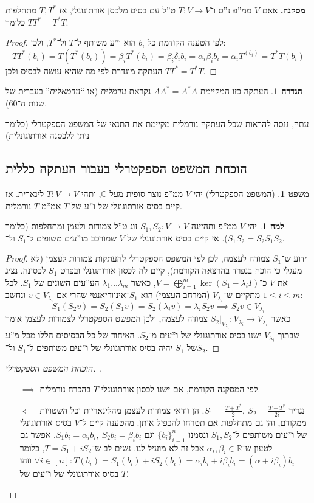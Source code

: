 \documentclass[a4paper]{article}
\newcommand\R     {\mathbb{R}}
\newcommand\C     {\mathbb{C}}
\newcommand\co        {\colon}
\newcommand\ag        {\alpha}
\newcommand\bg        {\beta}
\newcommand\dg        {\delta}
\renewcommand\lg      {\lambda}
\theoremstyle{definition}
\newtheorem{Theorem}{משפט}
\newtheorem{definition}{הגדרה}
\newtheorem{Lemma}{למה}
\newcommand\theo  [1] {\begin{Theorem}#1\end{Theorem}}
\newcommand\defi  [1] {\begin{definition}#1\end{definition}}
\newcommand\lem   [1] {\begin{Lemma}#1\end{Lemma}}
\begin{document}
	\textbf{מסקנה. }אאם $V$ ממ''פ נ''ס ו־$T \co V \to V$ ט''ל עם בסיס מלכסן אורתוגונלי, אז $T, T^*$ מתחלפות כלומר $TT^* = T^*T$. \begin{proof}
		לפי הטענה הקודמת כל $b_i$ הוא ו''ע משותף ל־$T$ ול־$T^*$, ולכן: 
		\[ TT^*(b_i) = T(T^*(b_i)) = \bg_i T^*(b_i) = \bg_i \dg_i b_i = \ag_i \bg_i b_i = \ag_i T^(b_i) = T^*T(b_i) \]
		העתקה מוגדרת לפי מה שהיא עושה לבסיס ולכן $TT^* = T^*T$. 
	\end{proof}
	\defi{העתקה כזו המקיימת $AA^* = A^*A$ נקראת \textit{נורמלית} (או ``\textit{נורמאלית}'' בעברית של שנות ה־60). }
	
	עתה, ננסה להראות שכל העתקה נורמלית מקיימת את התנאי של המשפט הספקטרלי (כלומר ניתן ללכסנה אורתוגונלית)
	
	\subsection{הוכחת המשפט הספקטרלי בעבור העתקה כללית}
	\theo{(המשפט הספקטרלי) יהי $V$ ממ''פ נוצר סופית מעל $\C$, ותהי $T \co V \to V$ לינארית. אז קיים בסיס אורתוגונלי של ו''ע של $T$ אמ''מ $T$ נורמלית. }
	\lem{יהי $V$ ממ''פ ותהיינה $S_1, S_2 \co V \to V$  זוג ט''ל צמודות ולעמן ומתחלפות (כלומר $S_1S_2 = S_2 S_1$). אז קיים בסיס אורתוגונלי של $V$ שמורכב מו''עים משופים ל־$S_1$ ול־$S_2$. }\begin{proof}
		ידוע ש־$S_1$ צמודה לעצמה, לכן לפי המשפט הספקטרלי להעתקות צמודות לעצמן (לא מעגלי כי הוכח בנפרד בהרצאה הקודמת), קיים לה לכסון אורותגונלי ובפרט $S_1$ לכסינה. נציג את $V$ כ־$V = \bigoplus_{i = 1}^{m} \ker(S_1 - \lg_iI)$, כאשר $\lg _1 \dots \lg_m$ הע''עים השונים של $S_1$. לכל $1 \le i \le m$  מתקיים ש־$V_{\lg_i}$ (המרחב העצמי) הוא $S_1$־אינווריאנטי שהרי אם $v \in V_{\lg_i}$ ונחשב: 
		\[ S_1(S_2 v) = S_2(S_1 v) = S_2(\lg_i v) = \lg _i S_2v \implies S_2 v \in V_{\lg_i} \]
		כאשר $S_2|_{V_{\lg _i}} \co V_{\lg_i} \to V_{\lg_i}$ צמודה לעצמה, ולכן המפשט הספקטרלי לצמודות לעצמן אומר שבתוך $V_{\lg_i}$ ישנו בסיס אורתוגונלי של ו''עים מ־$S_2$. האיחוד של כל הבסיסים הללו מכל מ''ע של $S_1$ יהיה בסיס אורתוגונלי של ו''עים משותפים ל־$S_1$ ול־$S_2$. 
	\end{proof}
	\begin{proof}[הוכחת המשפט הספקטרלי. ]\,
		\begin{itemize}
			\item[$\implies$] לפי המסקנה הקודמת, אם ישנו לכסון אורתוגונלי $T$ בהכרח נורמלית. 
			\item[$\impliedby$] נגדיר $S_1 = \frac{T + T^*}{2}, \ S_2 = \frac{T - T^*}{2i}$. הן וודאי צמודות לעצמן מהלינאריות וכל השטויות ממקודם, והן גם מתחלפות אם תטרחו להכפיל אותן. מהטענה קיים ל־$V$ בסיס אורתוגונלי של ו''עים משותפים ל־$S_1, S_2$ ונסמנו $\{b_i\}^{n}_{i = 1}$ וגם $S_1b_i = \ag_i b_i, \ S_2b_i= \bg_i b_i$. אפשר גם לטעון ש־$\ag_i, \bg_i \in \R$ אבל זה לא מועיל לנו. נשים לב ש־$T = S_1 + iS_2$, כלומר $\forall i \in [n] \co T(b_i) = S_1(b_i) + iS_2(b_i) = \ag_i b_i + i\bg_i b_i = (\ag + i\bg_i)b_i$ וזהו בסיס אורתוגונלי של ו''עים של $T$. 
		\end{itemize}
	\end{proof}
	
\end{document}
